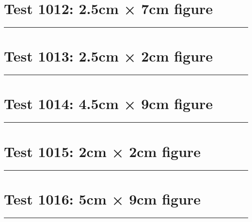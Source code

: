 \documentclass[a4paper,11pt]{article}
\begin{document}
\section*{Test 1012: 2.5cm × 7cm figure}
\begin{swarmwrap}%
  \begin{minipage}[t]{2cm}
    \centering
    \rule{\linewidth}{7cm}
  \end{minipage}%
\end{swarmwrap}%
\swarmwrapnext
\lipsum[77]
\lipsum[78]
\lipsum[79]
\lipsum[80]
\lipsum[81]
\lipsum[82]
\section*{Test 1013: 2.5cm × 2cm figure}
\begin{swarmwrap}%
  \begin{minipage}[t]{2cm}
    \centering
    \rule{\linewidth}{2cm}
  \end{minipage}%
\end{swarmwrap}%
\swarmwrapnext
\lipsum[55]
\lipsum[56]
\lipsum[57]
\lipsum[58]
\lipsum[59]
\lipsum[60]
\section*{Test 1014: 4.5cm × 9cm figure}
\begin{swarmwrap}%
  \begin{minipage}[t]{4cm}
    \centering
    \rule{\linewidth}{9cm}
  \end{minipage}%
\end{swarmwrap}%
\swarmwrapnext
\lipsum[62]
\lipsum[63]
\lipsum[64]
\lipsum[65]
\lipsum[66]
\section*{Test 1015: 2cm × 2cm figure}
\begin{swarmwrap}%
  \begin{minipage}[t]{2cm}
    \centering
    \rule{\linewidth}{2cm}
  \end{minipage}%
\end{swarmwrap}%
\swarmwrapnext
\lipsum[30]
\lipsum[31]
\lipsum[32]
\section*{Test 1016: 5cm × 9cm figure}
\begin{swarmwrap}%
  \begin{minipage}[t]{5cm}
    \centering
    \rule{\linewidth}{9cm}
  \end{minipage}%
\end{swarmwrap}%
\swarmwrapnext
\lipsum[25]
\lipsum[26]
\lipsum[27]
\lipsum[28]
\end{document}
